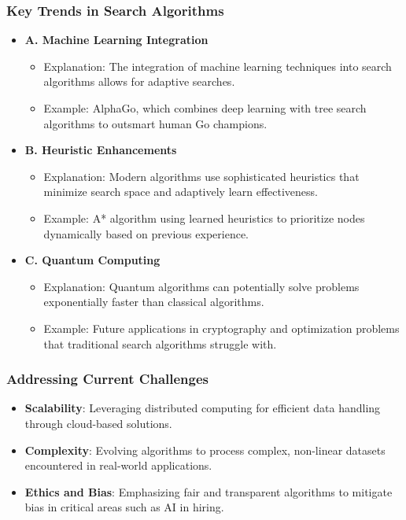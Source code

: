\documentclass[aspectratio=169]{beamer}
\begin{document}
\begin{frame}[fragile]
    \frametitle{Key Trends in Search Algorithms}
    \begin{itemize}
        \item \textbf{A. Machine Learning Integration}
        \begin{itemize}
            \item Explanation: The integration of machine learning techniques into search algorithms allows for adaptive searches. 
            \item Example: AlphaGo, which combines deep learning with tree search algorithms to outsmart human Go champions.
        \end{itemize}
        
        \item \textbf{B. Heuristic Enhancements}
        \begin{itemize}
            \item Explanation: Modern algorithms use sophisticated heuristics that minimize search space and adaptively learn effectiveness.
            \item Example: A* algorithm using learned heuristics to prioritize nodes dynamically based on previous experience.
        \end{itemize}
        
        \item \textbf{C. Quantum Computing}
        \begin{itemize}
            \item Explanation: Quantum algorithms can potentially solve problems exponentially faster than classical algorithms.
            \item Example: Future applications in cryptography and optimization problems that traditional search algorithms struggle with.
        \end{itemize}
    \end{itemize}
\end{frame}

\begin{frame}[fragile]
    \frametitle{Addressing Current Challenges}
    \begin{itemize}
        \item \textbf{Scalability}: Leveraging distributed computing for efficient data handling through cloud-based solutions.
        
        \item \textbf{Complexity}: Evolving algorithms to process complex, non-linear datasets encountered in real-world applications.
        
        \item \textbf{Ethics and Bias}: Emphasizing fair and transparent algorithms to mitigate bias in critical areas such as AI in hiring.
    \end{itemize}
\end{frame}
\end{document}
